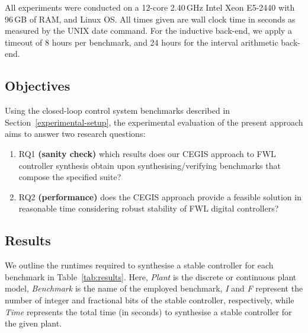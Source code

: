 \documentclass{sig-alternate-05-2015}
\begin{document}
All experiments were conducted on a 12-core 2.40\,GHz Intel Xeon E5-2440 with 96\,GB
of RAM, and Linux OS.  All times given are wall clock time in seconds as measured
by the UNIX date command.  For the inductive back-end, we apply a timeout of 8 hours
per benchmark, and 24 hours for the interval arithmetic back-end.

\subsection{Objectives}
\label{experimental-objectives}

Using the closed-loop control system benchmarks described in Section~\ref{experimental-setup}, 
the experimental evaluation of the present approach aims to answer two research questions:
%
\begin{enumerate}
	\item RQ1 \textbf{(sanity check)} which results does our CEGIS approach to FWL controller synthesis 
	obtain upon synthesising/verifying benchmarks that compose the specified suite?
  \item RQ2 \textbf{(performance)} does the CEGIS approach provide a feasible solution in reasonable time
	considering robust stability of FWL digital controllers?	
\end{enumerate}

\subsection{Results}
\label{experimental-results}

We outline the runtimes required to synthesise a stable controller for each
benchmark in Table~\ref{tab:results}. Here, \textit{Plant} is the discrete or 
continuous plant model, \textit{Benchmark} is the name of the employed benchmark,
\textit{I} and \textit{F} represent the number of integer and fractional bits of the 
stable controller, respectively, while \textit{Time} represents the total time 
(in seconds) to synthesise a stable controller for the given plant.
\end{document}
